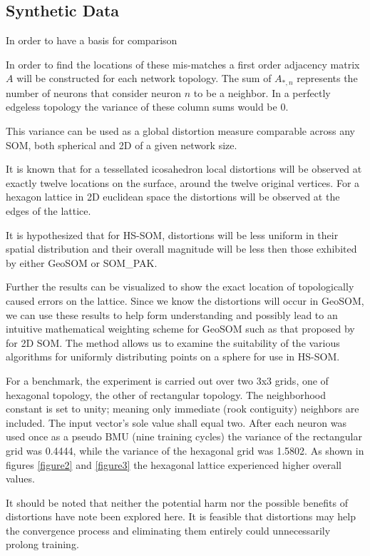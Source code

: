 \documentclass[11pt]{article}
\begin{document}
\subsection{Synthetic Data}
In order to have a basis for comparison 



In order to find the locations of these mis-matches a
first order adjacency matrix \(A\) will be constructed for each network
topology.  The sum of \(A_{*,n}\) represents the number of neurons that consider
neuron \(n\) to be a neighbor.  In a perfectly edgeless topology the variance of
these column sums would be \(0\).

This variance can be used as a global distortion measure comparable across any SOM, both spherical and 2D of a given network size.

It is known that for a tessellated icosahedron local distortions
will be observed at exactly twelve locations on the surface, around the twelve
original vertices.  For a hexagon lattice in 2D euclidean space the
distortions will be observed at the edges of the lattice.  

It is hypothesized that for HS-SOM, distortions will be less uniform in their spatial
distribution and their overall magnitude will be less then those exhibited by
either GeoSOM or SOM\_PAK.

Further the results can be visualized to show the exact location of
topologically caused errors on the lattice.  Since we know the distortions
will occur in GeoSOM, we can use these results to help form understanding and
possibly lead to an intuitive mathematical weighting scheme for GeoSOM such as
that proposed by \cite{Kohonen2000} for 2D SOM. The method allows us to
examine the suitability of the various algorithms for uniformly distributing
points on a sphere for use in HS-SOM.

For a benchmark, the experiment is carried out over two 3x3 grids, one of
hexagonal topology, the other of rectangular topology. The neighborhood
constant is set to unity; meaning only immediate (rook contiguity) neighbors
are included. The input vector's sole value shall equal two. After each
neuron was used once as a pseudo BMU (nine training cycles) the variance of
the rectangular grid was 0.4444, while the variance of the hexagonal grid was
1.5802. As shown in figures \ref{figure2} and \ref{figure3} the hexagonal lattice
experienced higher overall values.

It should be noted that neither the potential harm nor the possible benefits
of distortions have note been explored here.  It is feasible that distortions
may help the convergence process and eliminating them entirely could
unnecessarily prolong training.
\end{document}

